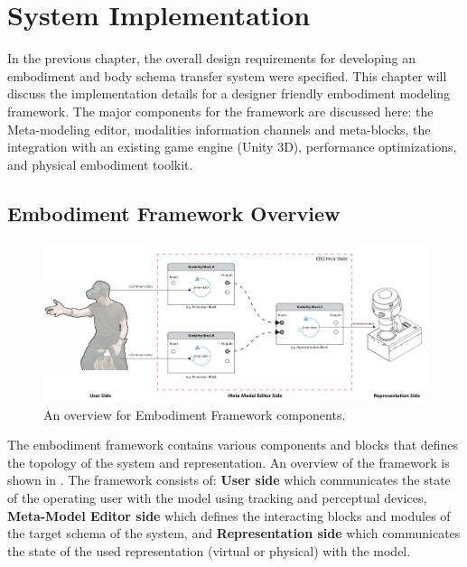 
\chapter{System Implementation}
\label{ch:impl}

In the previous chapter, the overall design requirements for developing an embodiment and body schema transfer system were specified. This chapter will discuss the implementation details for a designer friendly embodiment modeling framework. The major components for the framework are discussed here: the Meta-modeling editor, modalities information channels and meta-blocks, the integration with an existing game engine (Unity 3D), performance optimizations, and physical embodiment toolkit. 

\section{Embodiment Framework Overview}


\begin{figure}[b!]
\centering
\captionsetup{justification=centering} 
\includegraphics[width=1\textwidth]{figures/system/EDD_Editor_Overview.pdf}
\caption{An overview for Embodiment Framework components.}
  \label{fig:system-edd-overview}
\end{figure}

The embodiment framework contains various components and blocks that defines the topology of the system and representation. An overview of the framework is shown in . The framework consists of: \textbf{User side} which communicates the state of the operating user with the model using tracking and perceptual devices, \textbf{Meta-Model Editor side} which defines the interacting blocks and modules of the target schema of the system, and \textbf{Representation side} which communicates the state of the used representation (virtual or physical) with the model. 

